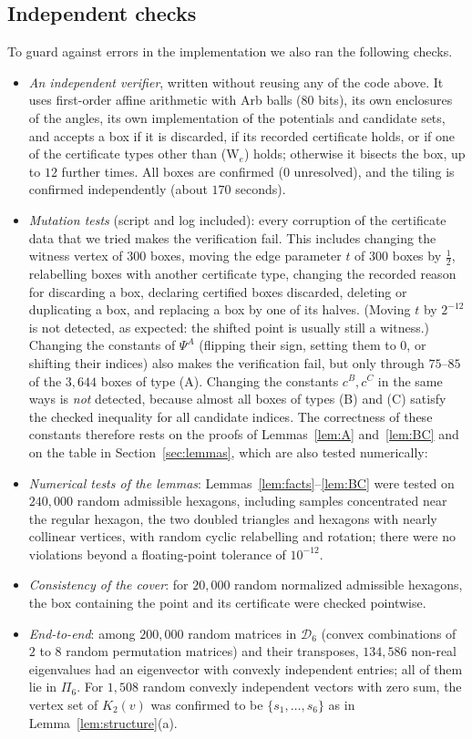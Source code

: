 \documentclass[11pt]{amsart}
\theoremstyle{definition}
\theoremstyle{remark}
\newcommand{\cD}{\mathcal{D}}
\begin{document}
\subsection{Independent checks}
To guard against errors in the implementation we also ran the following checks.
\begin{itemize}[leftmargin=2em]
\item \emph{An independent verifier}, written without reusing any of the code above. It uses first-order affine arithmetic with Arb balls ($80$ bits), its own enclosures of the angles, its own implementation of the potentials and candidate sets, and accepts a box if it is discarded, if its recorded certificate holds, or if one of the certificate types other than (W$_e$) holds; otherwise it bisects the box, up to $12$ further times. All boxes are confirmed ($0$ unresolved), and the tiling is confirmed independently (about $170$ seconds).
\item \emph{Mutation tests} (script and log included): every corruption of the certificate data that we tried makes the verification fail. This includes changing the witness vertex of $300$ boxes, moving the edge parameter $t$ of $300$ boxes by $\frac12$, relabelling boxes with another certificate type, changing the recorded reason for discarding a box, declaring certified boxes discarded, deleting or duplicating a box, and replacing a box by one of its halves. (Moving $t$ by $2^{-12}$ is not detected, as expected: the shifted point is usually still a witness.) Changing the constants of $\Psi^A$ (flipping their sign, setting them to $0$, or shifting their indices) also makes the verification fail, but only through $75$--$85$ of the $3{,}644$ boxes of type (A). Changing the constants $c^B,c^C$ in the same ways is \emph{not} detected, because almost all boxes of types (B) and (C) satisfy the checked inequality for all candidate indices. The correctness of these constants therefore rests on the proofs of Lemmas~\ref{lem:A} and~\ref{lem:BC} and on the table in Section~\ref{sec:lemmas}, which are also tested numerically:
\item \emph{Numerical tests of the lemmas}: Lemmas~\ref{lem:facts}--\ref{lem:BC} were tested on $240{,}000$ random admissible hexagons, including samples concentrated near the regular hexagon, the two doubled triangles and hexagons with nearly collinear vertices, with random cyclic relabelling and rotation; there were no violations beyond a floating-point tolerance of $10^{-12}$.
\item \emph{Consistency of the cover}: for $20{,}000$ random normalized admissible hexagons, the box containing the point and its certificate were checked pointwise.
\item \emph{End-to-end}: among $200{,}000$ random matrices in $\cD_6$ (convex combinations of $2$ to $8$ random permutation matrices) and their transposes, $134{,}586$ non-real eigenvalues had an eigenvector with convexly independent entries; all of them lie in $\Pi_6$. For $1{,}508$ random convexly independent vectors with zero sum, the vertex set of $K_2(v)$ was confirmed to be $\{s_1,\dots,s_6\}$ as in Lemma~\ref{lem:structure}(a).
\end{itemize}
\end{document}
